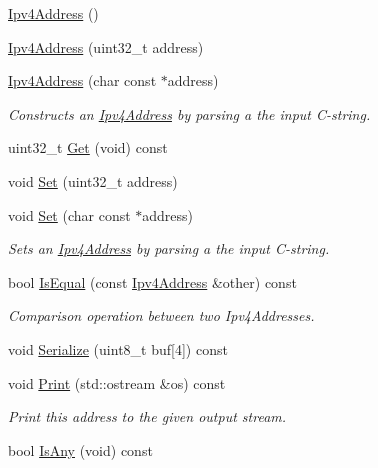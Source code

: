 \begin{DoxyCompactItemize}
\item 
\hyperlink{classns3_1_1Ipv4Address_aaabb51dd481f4b6908afd72affc49b20}{Ipv4\+Address} ()
\item 
\hyperlink{classns3_1_1Ipv4Address_a23eda6eb83d51a37e6a98cb65c857048}{Ipv4\+Address} (uint32\+\_\+t address)
\item 
\hyperlink{classns3_1_1Ipv4Address_ac18922ac9581589a3a944e2568537214}{Ipv4\+Address} (char const $\ast$address)
\begin{DoxyCompactList}\small\item\em Constructs an \hyperlink{classns3_1_1Ipv4Address}{Ipv4\+Address} by parsing a the input C-\/string. \end{DoxyCompactList}\item 
uint32\+\_\+t \hyperlink{classns3_1_1Ipv4Address_ae65810a69898982e927b83660d3bc4d8}{Get} (void) const 
\item 
void \hyperlink{classns3_1_1Ipv4Address_a7204982c2906b7df3f73739ca472dacb}{Set} (uint32\+\_\+t address)
\item 
void \hyperlink{classns3_1_1Ipv4Address_ab92fcc55afbf4f0c10d3ae125d092313}{Set} (char const $\ast$address)
\begin{DoxyCompactList}\small\item\em Sets an \hyperlink{classns3_1_1Ipv4Address}{Ipv4\+Address} by parsing a the input C-\/string. \end{DoxyCompactList}\item 
bool \hyperlink{classns3_1_1Ipv4Address_a73f1da02f9909863d10d54b748c335af}{Is\+Equal} (const \hyperlink{classns3_1_1Ipv4Address}{Ipv4\+Address} \&other) const 
\begin{DoxyCompactList}\small\item\em Comparison operation between two Ipv4\+Addresses. \end{DoxyCompactList}\item 
void \hyperlink{classns3_1_1Ipv4Address_afa8e7c9d7347c91dfcf5dab3f4a71a2b}{Serialize} (uint8\+\_\+t buf\mbox{[}4\mbox{]}) const 
\item 
void \hyperlink{classns3_1_1Ipv4Address_aa1eb6e1e4a2ab0c24a9c371dcefdb766}{Print} (std\+::ostream \&os) const 
\begin{DoxyCompactList}\small\item\em Print this address to the given output stream. \end{DoxyCompactList}\item 
bool \hyperlink{classns3_1_1Ipv4Address_a7bc77c0c478220dca4b9a6f5eb25f94a}{Is\+Any} (void) const 

\end{DoxyCompactItemize}
